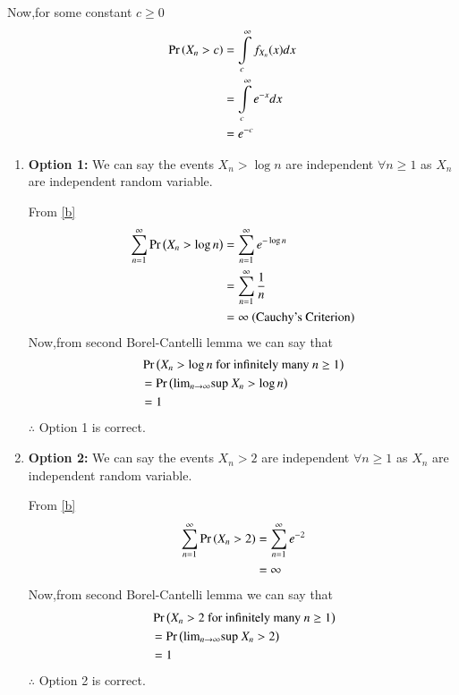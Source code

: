 \documentclass[journal,12pt,twocolumn]{IEEEtran}
\begin{document}
Now,for some constant $c\geq0$
\begin{align}
    \Pr\left(X_n>c\right)&=\int\limits_{c}^{\infty}f_{X_n}(x)dx\nonumber\\
              &=\int\limits_{c}^{\infty}e^{-x}dx\nonumber\\
              &=e^{-c}\label{b}
\end{align}
\begin{enumerate}
    \item \textbf{Option 1:} 
    We can say the events $X_n>\log n$ are independent $\forall n\geq 1$ as $X_n$ are independent random variable.
    
    From \eqref{b}
    \begin{align}
        \sum_{n=1}^{\infty}\Pr\left(X_n > \log n\right) &=\sum_{n=1}^{\infty}e^{-\log n}\nonumber\\ &=\sum_{n=1}^{\infty}\frac{1}{n}\nonumber\\
                                            &= \infty  \text{ (Cauchy's Criterion)}\nonumber
    \end{align}
    Now,from second Borel-Cantelli lemma we can say that
    \begin{align}
        &\Pr\left(X_n>\log n \text{ for infinitely many }n\geq1\right)\nonumber\\
        &=\Pr\left(\text{lim}_{n \rightarrow \infty}\text{sup }X_n>\log n\right)\nonumber\\
        &=1\nonumber
    \end{align}
    $\therefore$ Option 1 is correct. 
    
    \item\textbf{Option 2:} We can say the events $X_n>2$ are independent $\forall n\geq 1$ as $X_n$ are independent random variable.
    
    From \eqref{b}
    \begin{align}
        \sum_{n=1}^{\infty}\Pr\left(X_n > 2\right) &= \sum_{n=1}^{\infty}e^{-2}\nonumber\\
                                            &= \infty\nonumber
    \end{align}
    Now,from second Borel-Cantelli lemma we can say that
    \begin{align}
        &\Pr\left(X_n>2 \text{ for infinitely many }n\geq1\right)\nonumber\\
        &=\Pr\left(\text{lim}_{n \rightarrow \infty}\text{sup }X_n>2\right)\nonumber\\
        &=1\nonumber
    \end{align}
    $\therefore$ Option 2 is correct.
    

\end{enumerate}
\end{document}
